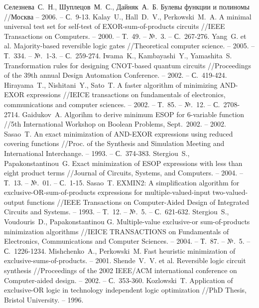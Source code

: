 \documentclass[a4paper,12pt,titlepage,finall]{article}
\begin{document}
\begin{raggedright}
\begin{thebibliography}{99}
     Селезнева~С.~Н., Шуплецов~М.~С., Дайняк~А.~Б. Булевы функции и полиномы //Москва – 2006. – С.~9-13.
     Kalay~U., Hall~D.~V., Perkowski~M.~A. A minimal universal test set for self-test of EXOR-sum-of-products circuits //IEEE Transactions on Computers. – 2000. – Т.~49. – №.~3. – С.~267-276.
     Yang~G. et al. Majority-based reversible logic gates //Theoretical computer science. – 2005. – Т.~334. – №.~1-3. – С.~259-274.
     Iwama~K., Kambayashi~Y., Yamashita~S. Transformation rules for designing CNOT-based quantum circuits //Proceedings of the 39th annual Design Automation Conference. – 2002. – С.~419-424.
     Hirayama~T., Nishitani~Y., Sato~T. A faster algorithm of minimizing AND-EXOR expressions //IEICE transactions on fundamentals of electronics, communications and computer sciences. – 2002. – Т.~85. – №.~12. – С.~2708-2714.
     Gaidukov~A. Algorihm to derive minimum ESOP for 6-variable function //5th International Workshop on Boolean Problems, Sept.~2002. – 2002.
     Sasao~T. An exact minimization of AND-EXOR expressions using reduced covering functions //Proc. of the Synthesis and Simulation Meeting and International Interchange. – 1993. – С.~374-383.
     Stergiou~S., Papakonstantinou~G. Exact minimization of ESOP expressions with less than eight product terms //Journal of Circuits, Systems, and Computers. – 2004. – Т.~13. – №.~01. – С.~1-15.
     Sasao~T. EXMIN2: A simplification algorithm for exclusive-OR-sum-of-products expressions for multiple-valued-input two-valued-output functions //IEEE Transactions on Computer-Aided Design of Integrated Circuits and Systems. – 1993. – Т.~12. – №.~5. – С.~621-632.
     Stergiou~S., Voudouris~D., Papakonstantinou G. Multiple-value exclusive-or sum-of-products minimization algorithms //IEICE TRANSACTIONS on Fundamentals of Electronics, Communications and Computer Sciences. – 2004. – Т.~87. – №.~5. – С.~1226-1234.
     Mishchenko~A., Perkowski~M. Fast heuristic minimization of exclusive-sums-of-products. – 2001.
     Shende~V.~V. et al. Reversible logic circuit synthesis //Proceedings of the 2002 IEEE/ACM international conference on Computer-aided design. – 2002. – С.~353-360.
     Kozlowski~T. Application of exclusive-OR logic in technology independent logic optimization //PhD Thesis, Bristol University. – 1996.

\end{thebibliography}
\end{raggedright}
\end{document}
